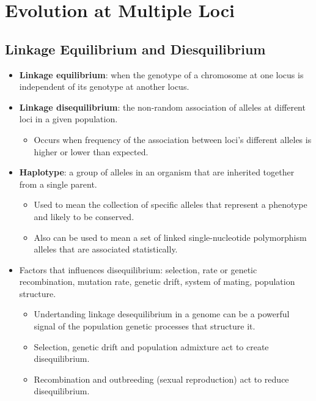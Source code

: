 \documentclass[12pt,a4paper]{article}
\begin{document}
\clearpage


\clearpage
\setcounter{section}{7}
\section{Evolution at Multiple Loci}
\subsection{Linkage Equilibrium and Diesquilibrium}
\begin{itemize}
    \item \textbf{Linkage equilibrium}: when the genotype of a chromosome at one locus is {\color{o-Sun}independent} of its genotype at another locus.
    \item \textbf{Linkage disequilibrium}: the non-random association of alleles at different loci in a given population. 
        \begin{itemize}
            \item Occurs when frequency of the association between loci's different alleles is higher or lower than expected.
        \end{itemize}
    \item \textbf{Haplotype}: a group of alleles in an organism that are inherited together from a single parent.
        \begin{itemize}
            \item Used to mean the collection of specific alleles that represent a phenotype and likely to be conserved.
            \item Also can be used to mean a set of linked single-nucleotide polymorphism alleles that are associated statistically.
        \end{itemize}
    \item Factors that influences disequilibrium: selection, rate or genetic recombination, mutation rate, genetic drift, system of mating, population structure.
        \begin{itemize}
            \item Undertanding linkage desequilibrium in a genome can be a powerful signal of the population genetic processes that structure it.
            \item Selection, genetic drift and population admixture act to {\color{pos}create disequilibrium}. 
            \item Recombination and outbreeding (sexual reproduction) act to {\color{neg}reduce disequilibrium}.

\end{itemize}
\end{itemize}
\end{document}

